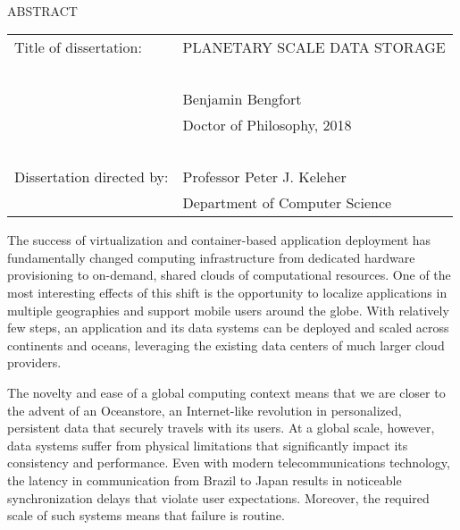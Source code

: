 
\hbox{\ }

\renewcommand{\baselinestretch}{1}
\small \normalsize

\begin{center}
\large{{ABSTRACT}}

\vspace{3em}

\end{center}
\hspace{-.15in}
\begin{tabular}{ll}
Title of dissertation:    & {\large  PLANETARY SCALE DATA STORAGE }\\
\ \\
&                          {\large  Benjamin Bengfort} \\
&                           {\large Doctor of Philosophy, 2018} \\
\ \\
Dissertation directed by: & {\large  Professor Peter J. Keleher} \\
&               {\large  Department of Computer Science } \\
\end{tabular}

\vspace{3em}

\renewcommand{\baselinestretch}{2}
\large \normalsize

The success of virtualization and container-based application deployment has fundamentally changed computing infrastructure from dedicated hardware provisioning to on-demand, shared clouds of computational resources. One of the most interesting effects of this shift is the opportunity to localize applications in multiple geographies and support mobile users around the globe. With relatively few steps, an application and its data systems can be deployed and scaled across continents and oceans, leveraging the existing data centers of much larger cloud providers.

The novelty and ease of a global computing context means that we are closer to the advent of an Oceanstore, an Internet-like revolution in personalized, persistent data that securely travels with its users. At a global scale, however, data systems suffer from physical limitations that significantly impact its consistency and performance. Even with modern telecommunications technology, the latency in communication from Brazil to Japan results in noticeable synchronization delays that violate user expectations. Moreover, the required scale of such systems means that failure is routine.

